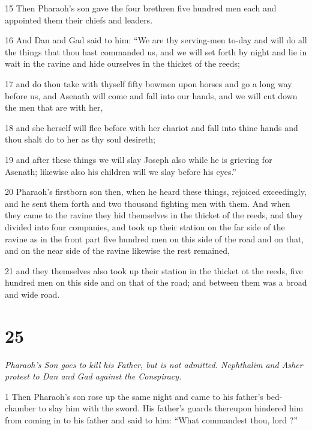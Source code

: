 \par 15 Then Pharaoh's son gave the four brethren five hundred men each and appointed them their chiefs and leaders. 

\par 16 And Dan and Gad said to him: “We are thy serving-men to-day and will do all the things that thou hast commanded us, and we will set forth by night and lie in wait in the ravine and hide ourselves in the thicket of the reeds; 

\par 17 and do thou take with thyself fifty bowmen upon horses and go a long way before us, and Asenath will come and fall into our hands, and we will cut down the men that are with her, 

\par 18 and she herself will flee before with her chariot and fall into thine hands and thou shalt do to her as thy soul desireth; 

\par 19 and after these things we will slay Joseph also while he is grieving for Asenath; likewise also his children will we slay before his eyes.”

\par 20 Pharaoh's firstborn son then, when he heard these things, rejoiced exceedingly, and he sent them forth and two thousand fighting men with them. And when they came to the ravine they hid themselves in the thicket of the reeds, and they divided into four companies, and took up their station on the far side of the ravine as in the front part five hundred men on this side of the road and on that, and on the near side of the ravine likewise the rest remained, 

\par 21 and they themselves also took up their station in the thicket ot the reeds, five hundred men on this side and on that of the road; and between them was a broad and wide road. 


\chapter{25}

\par \textit{Pharaoh's Son goes to kill his Father, but is not admitted. Nephthalim and Asher protest to Dan and Gad against the Conspiracy.}


\par 1 Then Pharaoh's son rose up the same night and came to his father's bed-chamber to slay him with the sword. His father's guards thereupon hindered him from coming in to his father and said to him: “What commandest thou, lord ?” 

